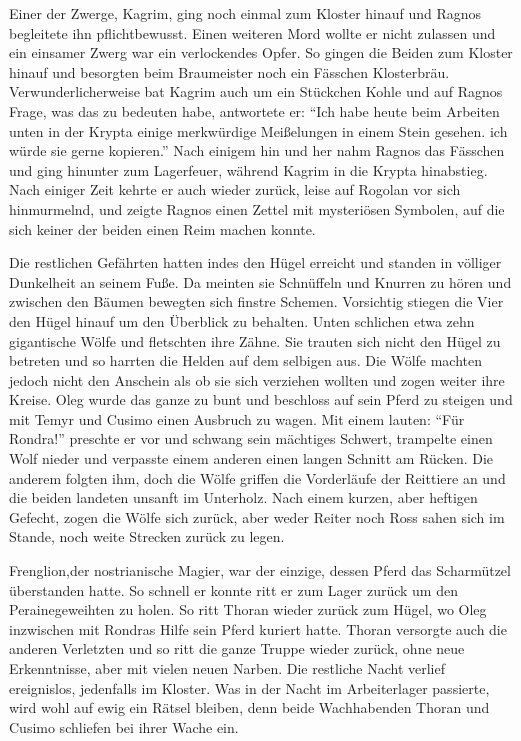 Einer der Zwerge, Kagrim, ging noch einmal zum Kloster hinauf und Ragnos begleitete ihn pflichtbewusst. Einen weiteren Mord wollte er nicht zulassen und ein einsamer Zwerg war ein verlockendes Opfer. So gingen die Beiden zum Kloster hinauf und besorgten beim Braumeister noch ein Fässchen Klosterbräu. Verwunderlicherweise bat Kagrim auch um ein Stückchen Kohle und auf Ragnos Frage, was das zu bedeuten habe, antwortete er: ``Ich habe heute beim Arbeiten unten in der Krypta einige merkwürdige Meißelungen in einem Stein gesehen. ich würde sie gerne kopieren.'' Nach einigem hin und her nahm Ragnos das Fässchen und ging hinunter zum Lagerfeuer, während Kagrim in die Krypta hinabstieg. Nach einiger Zeit kehrte er auch wieder zurück, leise auf Rogolan vor sich hinmurmelnd, und zeigte Ragnos einen Zettel mit mysteriösen Symbolen, auf die sich keiner der beiden einen Reim machen konnte.

Die restlichen Gefährten hatten indes den Hügel erreicht und standen in völliger Dunkelheit an seinem Fuße. Da meinten sie Schnüffeln und Knurren zu hören und zwischen den Bäumen bewegten sich finstre Schemen. Vorsichtig stiegen die Vier den Hügel hinauf um den Überblick zu behalten. Unten schlichen etwa zehn gigantische Wölfe und fletschten ihre Zähne. Sie trauten sich nicht den Hügel zu betreten und so harrten die Helden auf dem selbigen aus. Die Wölfe machten jedoch nicht den Anschein als ob sie sich verziehen wollten und zogen weiter ihre Kreise. Oleg wurde das ganze zu bunt und beschloss auf sein Pferd zu steigen und mit Temyr und Cusimo einen Ausbruch zu wagen. Mit einem lauten: ``Für Rondra!'' preschte er vor und schwang sein mächtiges Schwert, trampelte einen Wolf nieder und verpasste einem anderen einen langen Schnitt am Rücken. Die anderem folgten ihm, doch die Wölfe griffen die Vorderläufe der Reittiere an und die beiden landeten unsanft im Unterholz. Nach einem kurzen, aber heftigen Gefecht, zogen die Wölfe sich zurück, aber weder Reiter noch Ross sahen sich im Stande, noch weite Strecken zurück zu legen.

Frenglion,der nostrianische Magier, war der einzige, dessen Pferd das Scharmützel überstanden hatte. So schnell er konnte ritt er zum Lager zurück um den Perainegeweihten zu holen. So ritt Thoran wieder zurück zum Hügel, wo Oleg inzwischen mit Rondras Hilfe sein Pferd kuriert hatte. Thoran versorgte auch die anderen Verletzten und so ritt die ganze Truppe wieder zurück, ohne neue Erkenntnisse, aber mit vielen neuen Narben. Die restliche Nacht verlief ereignislos, jedenfalls im Kloster. Was in der Nacht im Arbeiterlager passierte, wird wohl auf ewig ein Rätsel bleiben, denn beide Wachhabenden Thoran und Cusimo schliefen bei ihrer Wache ein.

